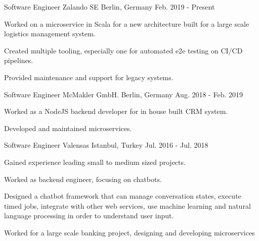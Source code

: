 


\begin{cventries}

  \cventry
    {Software Engineer}
    {Zalando SE}
    {Berlin, Germany}
    {Feb. 2019 - Present}
    {
      \begin{cvitems}
        \item {Worked on a microservice in Scala for a new architecture built for a large scale logistics management system.}
        \item {Created multiple tooling, especially one for automated e2e testing on CI/CD pipelines.}
        \item {Provided maintenance and support for legacy systems.}
      \end{cvitems}
    }


  \cventry
    {Software Engineer}
    {McMakler GmbH.}
    {Berlin, Germany}
    {Aug. 2018 - Feb. 2019}
    {
      \begin{cvitems}
        \item {Worked as a NodeJS backend developer for in house built CRM system.}
        \item {Developed and maintained microservices.}
      \end{cvitems}
    }

  \cventry
    {Software Engineer}
    {Valensas}
    {Istanbul, Turkey}
    {Jul. 2016 - Jul. 2018}
    {
      \begin{cvitems}
        \item {Gained experience leading small to medium sized projects.}
        \item {Worked as backend engineer, focusing on chatbots.}
        \item {Designed a chatbot framework that can manage conversation states, execute timed jobs, integrate with other web services, use machine learning and natural language processing in order to understand user input.}
        \item {Worked for a large scale banking project, designing and developing microservices}
      \end{cvitems}
    }


\end{cventries}
